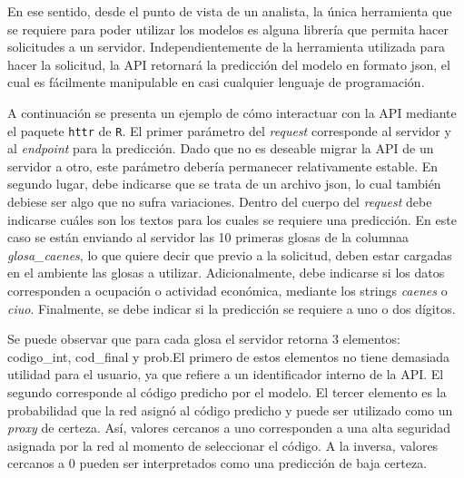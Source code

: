 \documentclass[
  12pt,
  spanish,
]{article}
\begin{document}
En ese sentido, desde el punto de vista de un analista, la única
herramienta que se requiere para poder utilizar los modelos es alguna
librería que permita hacer solicitudes a un servidor. Independientemente
de la herramienta utilizada para hacer la solicitud, la API retornará la
predicción del modelo en formato json, el cual es fácilmente manipulable
en casi cualquier lenguaje de programación.

A continuación se presenta un ejemplo de cómo interactuar con la API
mediante el paquete \texttt{httr} de \texttt{R}. El primer parámetro del
\emph{request} corresponde al servidor y al \emph{endpoint} para la
predicción. Dado que no es deseable migrar la API de un servidor a otro,
este parámetro debería permanecer relativamente estable. En segundo
lugar, debe indicarse que se trata de un archivo json, lo cual también
debiese ser algo que no sufra variaciones. Dentro del cuerpo del
\emph{request} debe indicarse cuáles son los textos para los cuales se
requiere una predicción. En este caso se están enviando al servidor las
10 primeras glosas de la columnaa \emph{glosa\_caenes}, lo que quiere
decir que previo a la solicitud, deben estar cargadas en el ambiente las
glosas a utilizar. Adicionalmente, debe indicarse si los datos
corresponden a ocupación o actividad económica, mediante los strings
\emph{caenes} o \emph{ciuo}. Finalmente, se debe indicar si la
predicción se requiere a uno o dos dígitos.

Se puede observar que para cada glosa el servidor retorna 3 elementos:
codigo\_int, cod\_final y prob.El primero de estos elementos no tiene
demasiada utilidad para el usuario, ya que refiere a un identificador
interno de la API. El segundo corresponde al código predicho por el
modelo. El tercer elemento es la probabilidad que la red asignó al
código predicho y puede ser utilizado como un \emph{proxy} de certeza.
Así, valores cercanos a uno corresponden a una alta seguridad asignada
por la red al momento de seleccionar el código. A la inversa, valores
cercanos a 0 pueden ser interpretados como una predicción de baja
certeza.
\end{document}
